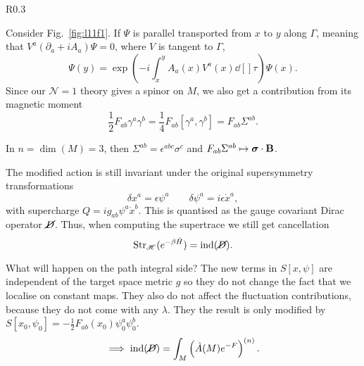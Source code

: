 \begin{wrapfigure}{R}{0.3\columnwidth}
  \centering
  \def\svgwidth{0.2\columnwidth}
  
  \caption{A charged fermion moving along trajectory $\Gamma$ in a background field $A$.}
  \label{fig:l11f1}
\end{wrapfigure}
Consider Fig.~\ref{fig:l11f1}. If $\Psi$ is parallel transported from $x$ to $y$ along $\Gamma$, meaning that $V^{a} (\partial_a + i A_a) \Psi = 0$, where $V$ is tangent to $\Gamma$, 
\begin{equation}
  \Psi(y) = \exp(-i \int_x^y A_a(x) V^{a}(x) \dd[]{\tau}) \Psi(x).
\end{equation}
Since our $\mathcal{N} = 1$ theory gives a spinor on $M$, we also get a contribution from its magnetic moment
\begin{equation}
  \frac{1}{2} F_{ab} \gamma^{a} \gamma^{b} = \frac{1}{4} F_{ab} [\gamma^{a}, \gamma^{b}] = F_{ab} \Sigma^{ab}.
\end{equation}
\begin{example}[]
  In $n = \dim (M) = 3$, then $\Sigma^{ab} = \epsilon^{abc} \sigma^{c}$ and $F_{ab} \Sigma^{ab} \mapsto \boldsymbol \sigma \cdot \vb{B}$.
\end{example}
The modified action is still invariant under the original supersymmetry transformations
\begin{equation}
  \delta x^{a} = \epsilon \psi^{a} \qquad \delta \psi^{a} = i \epsilon \dot{x}^{a},
\end{equation}
with supercharge $Q = i g_{ab} \psi^{a} \dot{x}^{b}$. This is quantised as the gauge covariant Dirac operator $\cancel{D}$.
Thus, when computing the supertrace we still get cancellation
\begin{equation}
  \text{Str}_{\mathscr{H}} (e^{-\beta \hat{H}}) = \text{ind}(\cancel{D}).
\end{equation}

What will happen on the path integral side? The new terms in $S[x, \psi]$ are independent of the target space metric $g$ so they do not change the fact that we localise on constant maps. They also do not affect the fluctuation contributions, because they do not come with any $\lambda$.
They the result is only modified by $S[x_0, \psi_0] = -\frac{1}{2} F_{ab} (x_0) \psi_0^{a} \psi_0^{b}$.
\begin{equation}
  \implies \text{ind} (\cancel{D}) = \int_M \left( \hat{A}(M) e^{-F} \right)^{(n)}.
\end{equation}
